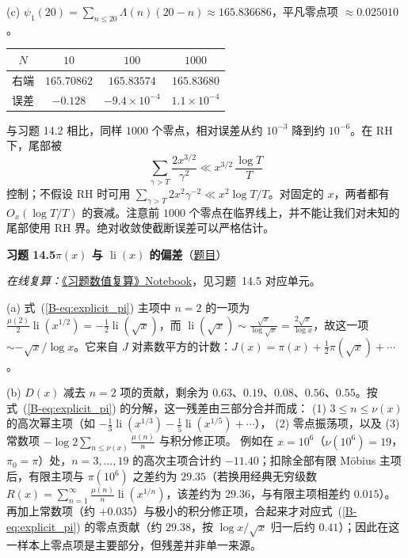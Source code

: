 \documentclass[11pt,a4paper]{article}
\DeclareMathOperator{\li}{li}
\newcommand{\bref}[1]{\ref*{B-#1}}
\newcommand{\Sol}[2]{%
  \par\addvspace{1.2em}\noindent
  \hypertarget{s:#1}{}\textbf{习题 #1\quad #2}\hfill{\small（\hyperlink{q:#1}{题目}）}\par
  \nopagebreak\smallskip}
\begin{document}
(c) $\psi_1(20)=\sum_{n\le20}\Lambda(n)(20-n)\approx165.836686$，平凡零点项 $\approx0.025010$。
\begin{center}
\small
\begin{tabular}{@{}cccc@{}}
\toprule
$N$ & $10$ & $100$ & $1000$ \\
\midrule
右端 & $165.70862$ & $165.83574$ & $165.83680$ \\
误差 & $-0.128$ & $-9.4\times10^{-4}$ & $1.1\times10^{-4}$ \\
\bottomrule
\end{tabular}
\end{center}
与习题 14.2 相比，同样 $1000$ 个零点，相对误差从约 $10^{-3}$ 降到约 $10^{-6}$。在 RH 下，尾部被
\[
  \sum_{\gamma>T}\frac{2x^{3/2}}{\gamma^{2}}\ll x^{3/2}\,\frac{\log T}{T}
\]
控制；不假设 RH 时可用 $\sum_{\gamma>T}2x^2\gamma^{-2}\ll x^2\log T/T$。对固定的 $x$，两者都有 $O_x(\log T/T)$ 的衰减。注意前 $1000$ 个零点在临界线上，并不能让我们对未知的尾部使用 RH 界。绝对收敛使截断误差可以严格估计。

\Sol{14.5}{$\pi(x)$ 与 $\li(x)$ 的偏差}
\emph{在线复算：}\href{https://colab.research.google.com/github/lichengtong123/lichengtong-RH/blob/main/\%E4\%B9\%A0\%E9\%A2\%98\%E4\%B8\%8E\%E8\%A7\%A3\%E7\%AD\%94/\%E4\%B9\%A0\%E9\%A2\%98\%E6\%95\%B0\%E5\%80\%BC\%E5\%A4\%8D\%E7\%AE\%97.ipynb}{《习题数值复算》Notebook}，见习题~14.5 对应单元。

(a) 式~(\bref{eq:explicit_pi}) 主项中 $n=2$ 的一项为 $\frac{\mu(2)}2\li(x^{1/2})=-\frac12\li(\sqrt x)$，而 $\li(\sqrt x)\sim\frac{\sqrt x}{\log\sqrt x}=\frac{2\sqrt x}{\log x}$，故这一项 $\sim-\sqrt x/\log x$。它来自 $J$ 对素数平方的计数：$J(x)=\pi(x)+\frac12\pi(\sqrt x)+\cdots$。

(b) $D(x)$ 减去 $n=2$ 项的贡献，剩余为 $0.63$、$0.19$、$0.08$、$0.56$、$0.55$。按式~(\bref{eq:explicit_pi}) 的分解，这一残差由三部分合并而成：
(1) $3\le n\le\nu(x)$ 的高次幂主项（如 $-\frac13\li(x^{1/3})-\frac15\li(x^{1/5})+\cdots$），
(2) 零点振荡项，以及
(3) 常数项 $-\log2\sum_{n\le\nu(x)}\frac{\mu(n)}n$ 与积分修正项。
例如在 $x=10^6$（$\nu(10^6)=19$，$\pi_0=\pi$）处，$n=3,\dots,19$ 的高次主项合计约 $-11.40$；扣除全部有限 Möbius 主项后，有限主项与 $\pi(10^6)$ 之差约为 $29.35$（若换用经典无穷级数 $R(x)=\sum_{n=1}^\infty\frac{\mu(n)}n\li(x^{1/n})$，该差约为 $29.36$，与有限主项相差约 $0.015$）。再加上常数项（约 $+0.035$）与极小的积分修正项，合起来才对应式~(\bref{eq:explicit_pi}) 的零点贡献（约 $29.38$，按 $\log x/\sqrt x$ 归一后约 $0.41$）；因此在这一样本上零点项是主要部分，但残差并非单一来源。
\end{document}
